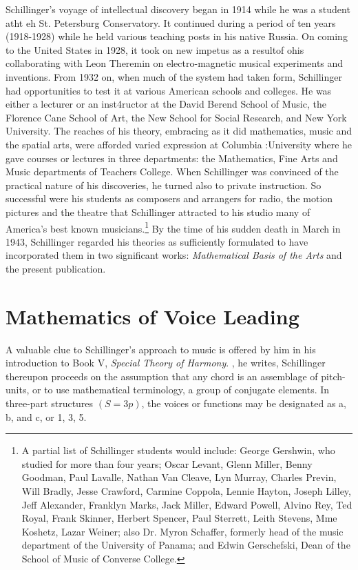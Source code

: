Schillinger's voyage of intellectual discovery began in 1914 while he was a
student atht eh St. Petersburg Conservatory. It continued during a period of
ten years (1918-1928) while he held various teaching posts in his native
Russia. On coming to the United States in 1928, it took on new impetus as a
resultof ohis collaborating with Leon Theremin on electro-magnetic musical
experiments and inventions. From 1932 on, when much of the system had taken
form, Schillinger had opportunities to test it at various American schools and
colleges. He was either a lecturer or an inst4ructor at the David Berend School
of Music, the Florence Cane School of Art, the New School for Social Research,
and New York University. The reaches of his theory, embracing as it did
mathematics, music and the spatial arts, were afforded varied expression at
Columbia :University where he gave courses or lectures in three departments:
the Mathematics, Fine Arts and Music departments of Teachers College. When
Schillinger was convinced of the practical nature of his discoveries, he turned
also to private instruction. So successful were his students as composers and
arrangers for radio, the motion pictures and the theatre that Schillinger
attracted to his studio many of America's best known musicians.\footnote{A
partial list of Schillinger students would include: George Gershwin, who
studied for more than four years; Oscar Levant, Glenn Miller, Benny Goodman,
Paul Lavalle, Nathan Van Cleave, Lyn Murray, Charles Previn, Will Bradly, Jesse
Crawford, Carmine Coppola, Lennie Hayton, Joseph Lilley, Jeff Alexander,
Franklyn Marks, Jack Miller, Edward Powell, Alvino Rey, Ted Royal, Frank
Skinner, Herbert Spencer, Paul Sterrett, Leith Stevens, Mme Koshetz, Lazar
Weiner; also Dr. Myron Schaffer, formerly head of the music department of the
University of Panama; and Edwin Gerschefski, Dean of the School of Music of
Converse College.} By the time of his sudden death in March in 1943, Schillinger regarded his theories as sufficiently formulated to have incorporated them in two significant works: \textit{Mathematical Basis of the Arts} and the present publication.

\section{Mathematics of Voice Leading} A valuable clue to Schillinger's
approach to music is offered by him in his introduction to Book V,
\textit{Special Theory of Harmony}. , he writes,  Schillinger
thereupon proceeds on the assumption that any chord is an assemblage of
pitch-units, or to use mathematical terminology, a group of conjugate elements.
In three-part structures $(S = 3p)$, the voices or functions may be designated
as a, b, and c, or 1, 3, 5.

